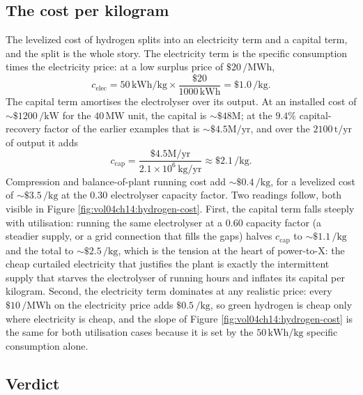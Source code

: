 \subsection{The cost per kilogram}

The levelized cost of hydrogen splits into an electricity term and a
capital term, and the split is the whole story. The electricity term is the
specific consumption times the electricity price: at a low surplus price of
$\$20\,\si{\per\mega\watt\hour}$,
\[
c_{\text{elec}} = 50\,\si{\kilo\watt\hour\per\kilogram}\times
\frac{\$20}{1000\,\si{\kilo\watt\hour}} = \$1.0\,\si{\per\kilogram}.
\]
The capital term amortises the electrolyser over its output. At an
installed cost of $\sim \$1200\,\si{\per\kilo\watt}$ for the $40\,\si{\mega
\watt}$ unit, the capital is $\sim \$48\text{M}$; at the $9.4\%$
capital-recovery factor of the earlier examples that is $\sim \$4.5\text{M}/
\text{yr}$, and over the $2100\,\text{t}/\text{yr}$ of output it adds
\[
c_{\text{cap}} = \frac{\$4.5\text{M}/\text{yr}}{2.1\times 10^6\,\si{
\kilogram}/\text{yr}} \approx \$2.1\,\si{\per\kilogram}.
\]
Compression and balance-of-plant running cost add $\sim \$0.4\,\si{\per
\kilogram}$, for a levelized cost of $\sim \$3.5\,\si{\per\kilogram}$ at the
$0.30$ electrolyser capacity factor. Two readings follow, both visible in
Figure \ref{fig:vol04ch14:hydrogen-cost}. First, the capital term falls
steeply with utilisation: running the same electrolyser at a $0.60$
capacity factor (a steadier supply, or a grid connection that fills the
gaps) halves $c_{\text{cap}}$ to $\sim \$1.1\,\si{\per\kilogram}$ and the
total to $\sim \$2.5\,\si{\per\kilogram}$, which is the tension at the heart
of power-to-X: the cheap curtailed electricity that justifies the plant is
exactly the intermittent supply that starves the electrolyser of running
hours and inflates its capital per kilogram. Second, the electricity term
dominates at any realistic price: every $\$10\,\si{\per\mega\watt\hour}$ on
the electricity price adds $\$0.5\,\si{\per\kilogram}$, so green hydrogen is
cheap only where electricity is cheap, and the slope of Figure
\ref{fig:vol04ch14:hydrogen-cost} is the same for both utilisation cases
because it is set by the $50\,\si{\kilo\watt\hour}/\si{\kilogram}$ specific
consumption alone.



\subsection{Verdict}


